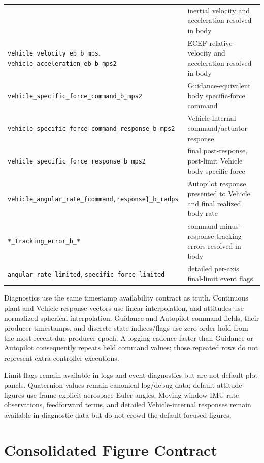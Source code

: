 \begin{center}
\begin{longtable}{p{}p{}}
& inertial velocity and acceleration resolved in body \\
\texttt{vehicle\_velocity\_eb\_b\_mps},
\texttt{vehicle\_acceleration\_eb\_b\_mps2}
& ECEF-relative velocity and acceleration resolved in body \\
\texttt{vehicle\_specific\_force\_command\_b\_mps2}
& Guidance-equivalent body specific-force command \\
\texttt{vehicle\_specific\_force\_command\_response\_b\_mps2}
& Vehicle-internal command/actuator response \\
\texttt{vehicle\_specific\_force\_response\_b\_mps2}
& final post-response, post-limit Vehicle body specific force \\
\texttt{vehicle\_angular\_rate\_\{command,response\}\_b\_radps}
& Autopilot response presented to Vehicle and final realized body rate \\
\texttt{*\_tracking\_error\_b\_*}
& command-minus-response tracking errors resolved in body \\
\texttt{angular\_rate\_limited},
\texttt{specific\_force\_limited}
& detailed per-axis final-limit event flags \\
\bottomrule
\end{longtable}
\end{center}

Diagnostics use the same timestamp availability contract as truth. Continuous
plant and Vehicle-response vectors use linear interpolation, and attitudes use
normalized spherical interpolation. Guidance and Autopilot command fields,
their producer timestamps, and discrete state indices/flags use zero-order hold from
the most recent due producer epoch. A logging cadence faster than Guidance or
Autopilot consequently repeats held command values; those repeated rows do not
represent extra controller executions.

Limit flags remain available in logs and event diagnostics but are not default
plot panels. Quaternion values remain canonical log/debug data; default
attitude figures use frame-explicit aerospace Euler angles. Moving-window IMU
rate observations, feedforward terms, and detailed Vehicle-internal responses
remain available in diagnostic data but do not crowd the default focused
figures.

\section{Consolidated Figure Contract}

